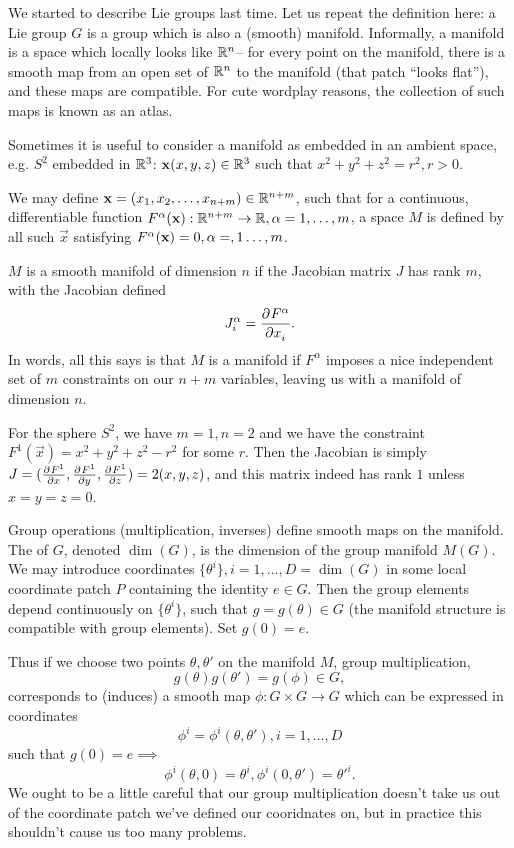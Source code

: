 We started to describe Lie groups last time. Let us repeat the definition here: a Lie group $G$ is a group which is also a (smooth) manifold. Informally, a manifold is a space which locally looks like $\RR^n$-- for every point on the manifold, there is a smooth map from an open set of $\RR^n$ to the manifold (that patch ``looks flat''), and these maps are compatible. For cute wordplay reasons, the collection of such maps is known as an atlas.

Sometimes it is useful to consider a manifold as embedded in an ambient space, e.g. $S^2$ embedded in $\RR^3$: $\vec{x}(x,y,z)\in \RR^3$ such that $x^2+y^2+z^2=r^2, r>0$.

\begin{defn}
We may define $\vec{x}=(x_1,x_2,\ldots,x_{n+m})\in \RR^{n+m}$, such that for a continuous, differentiable function $F^\alpha(\vec{x}): \RR^{n+m}\to \RR, \alpha=1,\ldots,m$, a space $M$ is defined by all such $\vec{x}$ satisfying $F^\alpha(\vec{x})=0,\a=,1\ldots,m$.
\end{defn}

\begin{thm}\label{manifoldcondition}
$M$ is a smooth manifold of dimension $n$ if the Jacobian matrix $J$ has rank $m$, with the Jacobian defined
$$J^\alpha_i =\P{F^\alpha}{x_i}.$$
In words, all this says is that $M$ is a manifold if $F^\alpha$ imposes a nice independent set of $m$ constraints on our $n+m$ variables, leaving us with a manifold of dimension $n$.
\end{thm}

\begin{exm}
For the sphere $S^2$, we have $m=1,n=2$ and we have the constraint $F^1(\vec{x})=x^2+y^2+z^2-r^2$ for some $r$. Then the Jacobian is simply $J=(\P{F^1}{x},\P{F^1}{y},\P{F^1}{z})=2(x,y,z)$, and this matrix indeed has rank $1$ unless $x=y=z=0$.
\end{exm}

Group operations (multiplication, inverses) define smooth maps on the manifold. The  of $G$, denoted $\dim(G)$, is the dimension of the group manifold $M(G)$. We may introduce coordinates $\{\theta^i\}, i=1,\ldots, D=\dim(G)$ in some local coordinate patch $P$ containing the identity $e\in G$. Then the group elements depend continuously on $\{\theta^i\}$, such that $g=g(\theta)\in G$ (the manifold structure is compatible with group elements). Set $g(0)=e$. 

Thus if we choose two points $\theta,\theta'$ on the manifold $M$, group multiplication,
$$g(\theta)g(\theta')=g(\phi)\in G,$$
corresponds to (induces) a smooth map $\phi: G\times G \to G$
which can be expressed in coordinates
$$\phi^i=\phi^i(\theta,\theta'), i=1,\ldots,D$$
such that $g(0)=e \implies$
$$\phi^i(\theta,0)=\theta^i, \phi^i(0,\theta')={\theta'}^i.$$
We ought to be a little careful that our group multiplication doesn't take us out of the coordinate patch we've defined our cooridnates on, but in practice this shouldn't cause us too many problems.

